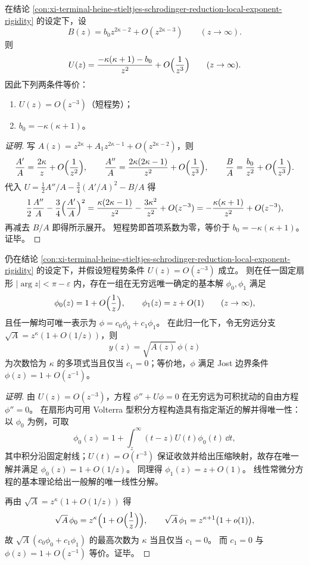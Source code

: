 \begin{conclusion}\label{con:xi-terminal-heine-stieltjes-short-range-tail-vanish}
在结论 \ref{con:xi-terminal-heine-stieltjes-schrodinger-reduction-local-exponent-rigidity} 的设定下，设
\[
B(z)=b_0 z^{2\kappa-2}+O(z^{2\kappa-3})\qquad(z\to\infty).
\]
则
\[
U(z)=\frac{-\kappa(\kappa+1)-b_0}{z^{2}}+O\Bigl(\frac{1}{z^{3}}\Bigr)\qquad(z\to\infty).
\]
因此下列两条件等价：
\begin{enumerate}
  \item \(U(z)=O(z^{-3})\)（短程势）；
  \item \(b_0=-\kappa(\kappa+1)\)。
\end{enumerate}
\end{conclusion}
\begin{proof}[证明]
写
\(
A(z)=z^{2\kappa}+A_1 z^{2\kappa-1}+O(z^{2\kappa-2})
\)，则
\[
\frac{A'}{A}=\frac{2\kappa}{z}+O\Bigl(\frac{1}{z^{2}}\Bigr),\qquad
\frac{A''}{A}=\frac{2\kappa(2\kappa-1)}{z^{2}}+O\Bigl(\frac{1}{z^{3}}\Bigr),\qquad
\frac{B}{A}=\frac{b_0}{z^{2}}+O\Bigl(\frac{1}{z^{3}}\Bigr).
\]
代入
\(
U=\tfrac12 A''/A-\tfrac34(A'/A)^2-B/A
\)
得
\[
\frac12\frac{A''}{A}-\frac34\Bigl(\frac{A'}{A}\Bigr)^2
=\frac{\kappa(2\kappa-1)}{z^{2}}-\frac{3\kappa^{2}}{z^{2}}+O(z^{-3})
=-\frac{\kappa(\kappa+1)}{z^{2}}+O(z^{-3}),
\]
再减去 \(B/A\) 即得所示展开。
短程势即首项系数为零，等价于 \(b_0=-\kappa(\kappa+1)\)。证毕。
\end{proof}

\begin{conclusion}\label{con:xi-terminal-heine-stieltjes-zero-energy-scattering-jost-normalization}
仍在结论 \ref{con:xi-terminal-heine-stieltjes-schrodinger-reduction-local-exponent-rigidity} 的设定下，并假设短程势条件 \(U(z)=O(z^{-3})\) 成立。
则在任一固定扇形 \(|\arg z|<\pi-\varepsilon\) 内，存在一组在无穷远唯一确定的基本解 \(\phi_{0},\phi_{1}\) 满足
\[
\phi_{0}(z)=1+O\Bigl(\frac{1}{z}\Bigr),
\qquad
\phi_{1}(z)=z+O(1)
\qquad(z\to\infty),
\]
且任一解均可唯一表示为 \(\phi=c_{0}\phi_{0}+c_{1}\phi_{1}\)。
在此归一化下，令无穷远分支 \(\sqrt A=z^{\kappa}(1+O(1/z))\)，则
\[
y(z)=\sqrt{A(z)}\,\phi(z)
\]
为次数恰为 \(\kappa\) 的多项式当且仅当 \(c_{1}=0\)；等价地，\(\phi\) 满足 Jost 边界条件 \(\phi(z)=1+O(z^{-1})\)。
\end{conclusion}
\begin{proof}[证明]
由 \(U(z)=O(z^{-3})\)，方程 \(\phi''+U\phi=0\) 在无穷远为可积扰动的自由方程 \(\phi''=0\)。
在扇形内可用 Volterra 型积分方程构造具有指定渐近的解并得唯一性：以 \(\phi_{0}\) 为例，可取
\[
\phi_{0}(z)=1+\int_{z}^{\infty}(t-z)U(t)\phi_{0}(t)\,\dd t,
\]
其中积分沿固定射线；\(U(t)=O(t^{-3})\) 保证收敛并给出压缩映射，故存在唯一解并满足 \(\phi_{0}(z)=1+O(1/z)\)。
同理得 \(\phi_{1}(z)=z+O(1)\)。
线性常微分方程的基本理论给出一般解的唯一线性分解。
\par
再由 \(\sqrt A=z^{\kappa}(1+O(1/z))\) 得
\[
\sqrt A\,\phi_{0}=z^{\kappa}\Bigl(1+O\Bigl(\frac{1}{z}\Bigr)\Bigr),
\qquad
\sqrt A\,\phi_{1}=z^{\kappa+1}\bigl(1+o(1)\bigr),
\]
故 \(\sqrt A(c_{0}\phi_{0}+c_{1}\phi_{1})\) 的最高次数为 \(\kappa\) 当且仅当 \(c_{1}=0\)。
而 \(c_{1}=0\) 与 \(\phi(z)=1+O(z^{-1})\) 等价。证毕。
\end{proof}

